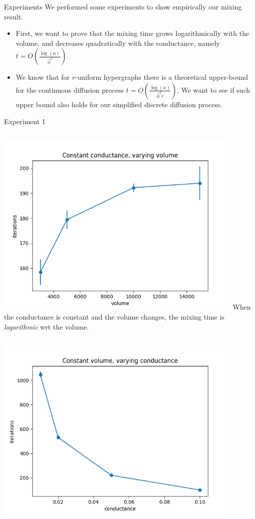 \documentclass[../main.tex]{subfiles}
\begin{document}
	\begin{frame}{Experiments}
		We performed some experiments to show empirically our mixing result. 
		\begin{itemize}
			\item First, we want to prove that the mixing time grows logarithmically with the volume, and decreases quadratically with the conductance, namely $t=O\left(\frac{\log(n)}{\hat{\phi}^2}\right).$
			\item We know that for $r$-uniform hypergraphs there is a theoretical upper-bound for the continuous diffusion process $t=O\left(\frac{\log(n)}{\hat{\phi}^2 r}\right)$. We want to see if such upper bound also holds for our simplified discrete diffusion process.
		\end{itemize}
	\end{frame}
	\begin{frame}{Experiment 1}
		\begin{columns}
		\includegraphics[width=0.9\textwidth]{Figures/const_cond}  
		When the conductance is constant and the volume changes, the mixing time is \textit{logarithmic} wrt the volume. 
		\end{columns} 
		\begin{columns}
			\column{0.5\textwidth}
			\includegraphics[width=0.9\textwidth]{Figures/const_vol}  

\end{columns}
\end{frame}
\end{document}
